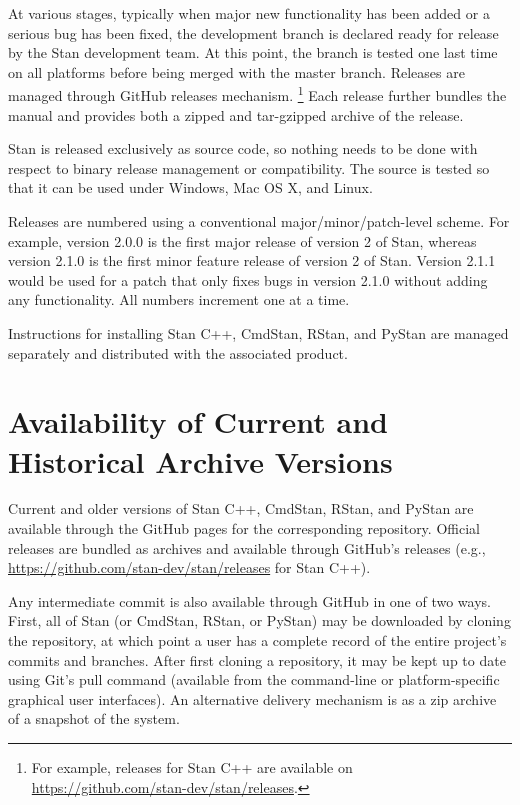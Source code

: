 At various stages, typically when major new functionality has been
added or a serious bug has been fixed, the development branch is
declared ready for release by the Stan development team. At this
point, the branch is tested one last time on all platforms before
being merged with the master branch. Releases are managed through
GitHub releases mechanism.%
%
\footnote{For example, releases for Stan C++ are available on
\url{https://github.com/stan-dev/stan/releases}.}
%
Each release further bundles the manual and provides both a zipped and
tar-gzipped archive of the release.

Stan is released exclusively as source code, so nothing needs to be
done with respect to binary release management or compatibility.  The
source is tested so that it can be used under Windows, Mac OS X, and
Linux.  

Releases are numbered using a conventional major/minor/patch-level
scheme.  For example, version 2.0.0 is the first major release of
version 2 of Stan, whereas version 2.1.0 is the first minor feature
release of version 2 of Stan.  Version 2.1.1 would be used for a patch
that only fixes bugs in version 2.1.0 without adding any
functionality.  All numbers increment one at a time.

Instructions for installing Stan C++, CmdStan, RStan, and PyStan are
managed separately and distributed with the associated product.

\section{Availability of Current and Historical Archive Versions}

Current and older versions of Stan C++, CmdStan, RStan, and PyStan are
available through the GitHub pages for the corresponding repository.
Official releases are bundled as archives and available through
GitHub's releases (e.g.,
\url{https://github.com/stan-dev/stan/releases} for Stan C++).

Any intermediate commit is also available through GitHub in one of two
ways. First, all of Stan (or CmdStan, RStan, or PyStan) may be
downloaded by cloning the repository, at which point a user has a
complete record of the entire project's commits and branches. After
first cloning a repository, it may be kept up to date using Git's pull
command (available from the command-line or platform-specific
graphical user interfaces).   An alternative delivery mechanism is as
a zip archive of a snapshot of the system.  

